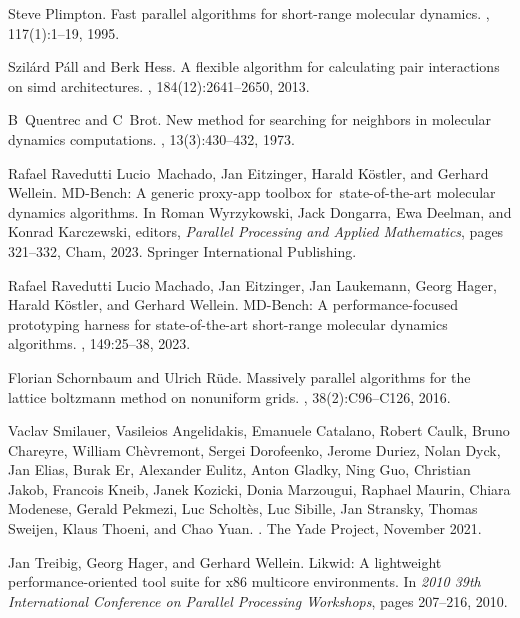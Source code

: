 \documentclass[Afour,sageh,times]{sagej}
\begin{document}
\begin{thebibliography}{99}
Steve Plimpton.
\newblock Fast parallel algorithms for short-range molecular dynamics.
, 117(1):1--19, 1995.

Szilárd Páll and Berk Hess.
\newblock A flexible algorithm for calculating pair interactions on simd
  architectures.
, 184(12):2641--2650, 2013.

B~Quentrec and C~Brot.
\newblock New method for searching for neighbors in molecular dynamics
  computations.
, 13(3):430--432, 1973.

Rafael Ravedutti Lucio~Machado, Jan Eitzinger, Harald K{\"o}stler, and Gerhard
  Wellein.
\newblock MD-Bench: A generic proxy-app toolbox for state-of-the-art molecular
  dynamics algorithms.
\newblock In Roman Wyrzykowski, Jack Dongarra, Ewa Deelman, and Konrad
  Karczewski, editors, {\em Parallel Processing and Applied Mathematics}, pages
  321--332, Cham, 2023. Springer International Publishing.

Rafael Ravedutti Lucio Machado, Jan Eitzinger, Jan Laukemann, Georg Hager,
  Harald Köstler, and Gerhard Wellein.
\newblock MD-Bench: A performance-focused prototyping harness for
  state-of-the-art short-range molecular dynamics algorithms.
, 149:25--38, 2023.

Florian Schornbaum and Ulrich R\"{u}de.
\newblock Massively parallel algorithms for the lattice boltzmann method on
  nonuniform grids.
, 38(2):C96--C126, 2016.

Vaclav Smilauer, Vasileios Angelidakis, Emanuele Catalano, Robert Caulk, Bruno
  Chareyre, William Chèvremont, Sergei Dorofeenko, Jerome Duriez, Nolan Dyck,
  Jan Elias, Burak Er, Alexander Eulitz, Anton Gladky, Ning Guo, Christian
  Jakob, Francois Kneib, Janek Kozicki, Donia Marzougui, Raphael Maurin, Chiara
  Modenese, Gerald Pekmezi, Luc Scholtès, Luc Sibille, Jan Stransky, Thomas
  Sweijen, Klaus Thoeni, and Chao Yuan.
.
\newblock The Yade Project, November 2021.

Jan Treibig, Georg Hager, and Gerhard Wellein.
\newblock Likwid: A lightweight performance-oriented tool suite for x86
  multicore environments.
\newblock In {\em 2010 39th International Conference on Parallel Processing
  Workshops}, pages 207--216, 2010.


\end{thebibliography}
\end{document}
